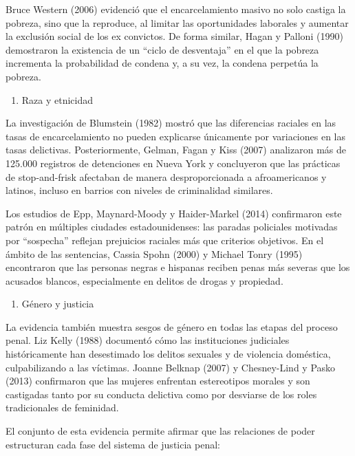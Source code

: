 \documentclass[
  spanish,
  letterpaper,
  DIV=11,
  numbers=noendperiod]{scrreprt}
\providecommand{\tightlist}{%
  \setlength{\itemsep}{0pt}\setlength{\parskip}{0pt}}
\begin{document}
Bruce Western (2006) evidenció que el encarcelamiento masivo no solo
castiga la pobreza, sino que la reproduce, al limitar las oportunidades
laborales y aumentar la exclusión social de los ex convictos. De forma
similar, Hagan y Palloni (1990) demostraron la existencia de un ``ciclo
de desventaja'' en el que la pobreza incrementa la probabilidad de
condena y, a su vez, la condena perpetúa la pobreza.

\begin{enumerate}
\def\labelenumi{\alph{enumi})}
\setcounter{enumi}{1}
\tightlist
\item
  Raza y etnicidad
\end{enumerate}

La investigación de Blumstein (1982) mostró que las diferencias raciales
en las tasas de encarcelamiento no pueden explicarse únicamente por
variaciones en las tasas delictivas. Posteriormente, Gelman, Fagan y
Kiss (2007) analizaron más de 125.000 registros de detenciones en Nueva
York y concluyeron que las prácticas de stop-and-frisk afectaban de
manera desproporcionada a afroamericanos y latinos, incluso en barrios
con niveles de criminalidad similares.

Los estudios de Epp, Maynard-Moody y Haider-Markel (2014) confirmaron
este patrón en múltiples ciudades estadounidenses: las paradas
policiales motivadas por ``sospecha'' reflejan prejuicios raciales más
que criterios objetivos. En el ámbito de las sentencias, Cassia Spohn
(2000) y Michael Tonry (1995) encontraron que las personas negras e
hispanas reciben penas más severas que los acusados blancos,
especialmente en delitos de drogas y propiedad.

\begin{enumerate}
\def\labelenumi{\alph{enumi})}
\setcounter{enumi}{2}
\tightlist
\item
  Género y justicia
\end{enumerate}

La evidencia también muestra sesgos de género en todas las etapas del
proceso penal. Liz Kelly (1988) documentó cómo las instituciones
judiciales históricamente han desestimado los delitos sexuales y de
violencia doméstica, culpabilizando a las víctimas. Joanne Belknap
(2007) y Chesney-Lind y Pasko (2013) confirmaron que las mujeres
enfrentan estereotipos morales y son castigadas tanto por su conducta
delictiva como por desviarse de los roles tradicionales de feminidad.

El conjunto de esta evidencia permite afirmar que las relaciones de
poder estructuran cada fase del sistema de justicia penal:
\end{document}
